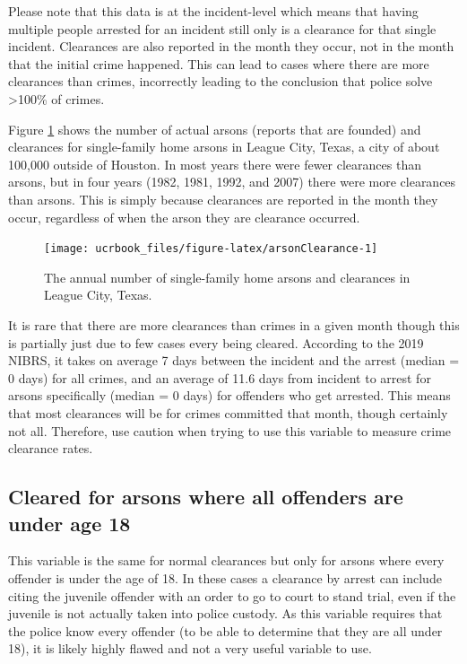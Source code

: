 \documentclass[
  12pt,
  openany]{book}
\begin{document}
Please note that this data is at the incident-level which means that having multiple people arrested for an incident still only is a clearance for that single incident. Clearances are also reported in the month they occur, not in the month that the initial crime happened. This can lead to cases where there are more clearances than crimes, incorrectly leading to the conclusion that police solve \textgreater100\% of crimes.

Figure \ref{fig:arsonClearance} shows the number of actual arsons (reports that are founded) and clearances for single-family home arsons in League City, Texas, a city of about 100,000 outside of Houston. In most years there were fewer clearances than arsons, but in four years (1982, 1981, 1992, and 2007) there were more clearances than arsons. This is simply because clearances are reported in the month they occur, regardless of when the arson they are clearance occurred.

\begin{figure}

{\centering \texttt{[image: ucrbook\_files/figure-latex/arsonClearance-1]} 

}

\caption{The annual number of single-family home arsons and clearances in League City, Texas.}\label{fig:arsonClearance}
\end{figure}

It is rare that there are more clearances than crimes in a given month though this is partially just due to few cases every being cleared. According to the 2019 NIBRS, it takes on average 7 days between the incident and the arrest (median = 0 days) for all crimes, and an average of 11.6 days from incident to arrest for arsons specifically (median = 0 days) for offenders who get arrested. This means that most clearances will be for crimes committed that month, though certainly not all. Therefore, use caution when trying to use this variable to measure crime clearance rates.

\hypertarget{cleared-for-arsons-where-all-offenders-are-under-age-18}{%
\subsection{Cleared for arsons where all offenders are under age 18}\label{cleared-for-arsons-where-all-offenders-are-under-age-18}}

This variable is the same for normal clearances but only for arsons where every offender is under the age of 18. In these cases a clearance by arrest can include citing the juvenile offender with an order to go to court to stand trial, even if the juvenile is not actually taken into police custody. As this variable requires that the police know every offender (to be able to determine that they are all under 18), it is likely highly flawed and not a very useful variable to use.
\end{document}

